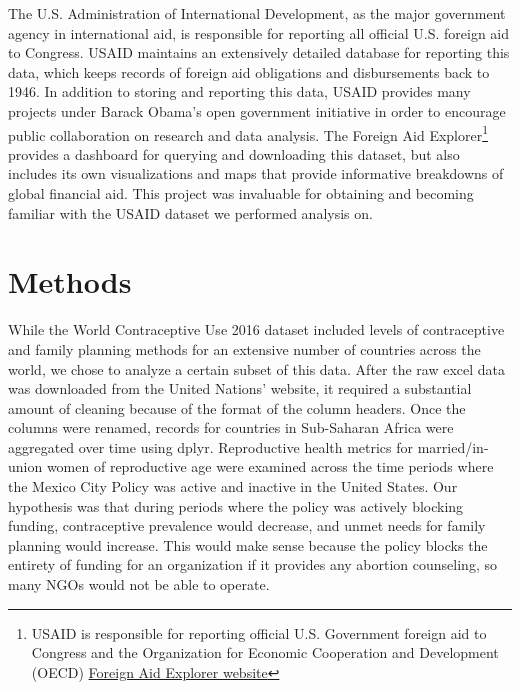 \documentclass[11pt,]{article}
\begin{document}
The U.S. Administration of International Development, as the major
government agency in international aid, is responsible for reporting all
official U.S. foreign aid to Congress. USAID maintains an extensively
detailed database for reporting this data, which keeps records of
foreign aid obligations and disbursements back to 1946. In addition to
storing and reporting this data, USAID provides many projects under
Barack Obama's open government initiative in order to encourage public
collaboration on research and data analysis. The Foreign Aid
Explorer\footnote{USAID is responsible for reporting official U.S.
  Government foreign aid to Congress and the Organization for Economic
  Cooperation and Development (OECD)
  \href{https://explorer.usaid.gov/aid-dashboard.html}{Foreign Aid
  Explorer website}} provides a dashboard for querying and downloading
this dataset, but also includes its own visualizations and maps that
provide informative breakdowns of global financial aid. This project was
invaluable for obtaining and becoming familiar with the USAID dataset we
performed analysis on.

\section{Methods}\label{methods}

While the World Contraceptive Use 2016 dataset included levels of
contraceptive and family planning methods for an extensive number of
countries across the world, we chose to analyze a certain subset of this
data. After the raw excel data was downloaded from the United Nations'
website, it required a substantial amount of cleaning because of the
format of the column headers. Once the columns were renamed, records for
countries in Sub-Saharan Africa were aggregated over time using dplyr.
Reproductive health metrics for married/in-union women of reproductive
age were examined across the time periods where the Mexico City Policy
was active and inactive in the United States. Our hypothesis was that
during periods where the policy was actively blocking funding,
contraceptive prevalence would decrease, and unmet needs for family
planning would increase. This would make sense because the policy blocks
the entirety of funding for an organization if it provides any abortion
counseling, so many NGOs would not be able to operate.
\end{document}
